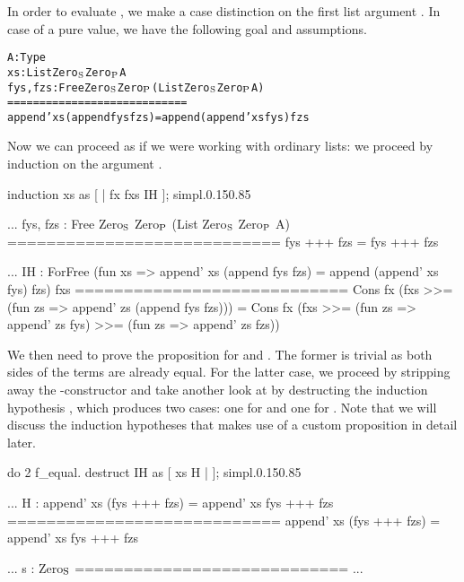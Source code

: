 In order to evaluate , we make a case distinction on the first list argument .
In case of a pure value, we have the following goal and assumptions.

\begin{alltt}
  A : Type
  xs : List Zero\(\sb{\text{S}}\) Zero\(\sb{\text{P}}\) A
  fys, fzs : Free Zero\(\sb{\text{S}}\) Zero\(\sb{\text{P}}\) (List Zero\(\sb{\text{S}}\) Zero\(\sb{\text{P}}\) A)
  ============================
  append' xs (append fys fzs) = append (append' xs fys) fzs
\end{alltt}

Now we can proceed as if we were working with ordinary lists: we proceed by induction on the  argument .

\begin{cproof1}{induction xs as [ | fx fxs IH ]; simpl.}{0.15}{0.85}
  
  ...
  fys, fzs : Free Zero\(\sb{\text{S}}\) Zero\(\sb{\text{P}}\) (List Zero\(\sb{\text{S}}\) Zero\(\sb{\text{P}}\) A)
  ============================
  fys +++ fzs = fys +++ fzs

  ...
  IH : ForFree (fun xs => append' xs (append fys fzs)
                        = append (append' xs fys) fzs) fxs
  ============================
  Cons fx (fxs >>= (fun zs => append' zs (append fys fzs))) =
  Cons fx (fxs >>= (fun zs => append' zs fys) >>=
                   (fun zs => append' zs fzs))
\end{cproof1}

We then need to prove the proposition for  and .
The former is trivial as both sides of the terms are already equal.
For the latter case, we proceed by stripping away the \--constructor and take another look at  by destructing the induction hypothesis , which produces two cases: one for  and one for .
Note that we will discuss the induction hypotheses  that makes use of a custom proposition  in detail later.

\begin{cproof1}{do 2 f_equal. destruct IH as [ xs H | ]; simpl.}{0.15}{0.85}
  
  ...
  H : append' xs (fys +++ fzs) = append' xs fys +++ fzs
  ============================
  append' xs (fys +++ fzs) = append' xs fys +++ fzs

  ...
  s : Zero\(\sb{\text{S}}\)
  ============================
  ...
\end{cproof1}

